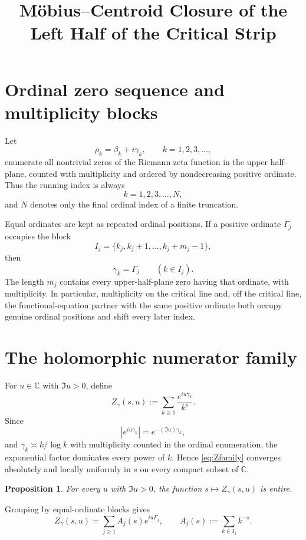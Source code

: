 \documentclass[11pt]{amsart}
\title{M\"obius--Centroid Closure of the Left Half of the Critical Strip}
\author{}
\date{}
\newtheorem{proposition}[theorem]{Proposition}
\theoremstyle{remark}
\begin{document}
\maketitle

\section{Ordinal zero sequence and multiplicity blocks}

Let
\[
\rho_k=\beta_k+i\gamma_k,\qquad k=1,2,3,\ldots,
\]
enumerate all nontrivial zeros of the Riemann zeta function in the upper half-plane, counted with multiplicity and ordered by nondecreasing positive ordinate.  Thus the running index is always
\[
k=1,2,3,\ldots,N,
\]
and $N$ denotes only the final ordinal index of a finite truncation.

Equal ordinates are kept as repeated ordinal positions.  If a positive ordinate $\Gamma_j$ occupies the block
\[
I_j=\{k_j,k_j+1,\ldots,k_j+m_j-1\},
\]
then
\[
\gamma_k=\Gamma_j\qquad(k\in I_j).
\]
The length $m_j$ contains every upper-half-plane zero having that ordinate, with multiplicity.  In particular, multiplicity on the critical line and, off the critical line, the functional-equation partner with the same positive ordinate both occupy genuine ordinal positions and shift every later index.

\section{The holomorphic numerator family}

For $u\in\mathbb C$ with $\Im u>0$, define
\begin{equation}\label{eq:Zfamily}
Z_\gamma(s,u)
:=
\sum_{k\ge1}\frac{e^{iu\gamma_k}}{k^s}.
\end{equation}
Since
\[
|e^{iu\gamma_k}|=e^{-(\Im u)\gamma_k},
\]
and $\gamma_k\asymp k/\log k$ with multiplicity counted in the ordinal enumeration, the exponential factor dominates every power of $k$.  Hence \eqref{eq:Zfamily} converges absolutely and locally uniformly in $s$ on every compact subset of $\mathbb C$.

\begin{proposition}\label{prop:entire}
For every $u$ with $\Im u>0$, the function $s\mapsto Z_\gamma(s,u)$ is entire.
\end{proposition}

Grouping by equal-ordinate blocks gives
\begin{equation}\label{eq:blockExpansion}
Z_\gamma(s,u)
=
\sum_{j\ge1} A_j(s)e^{iu\Gamma_j},
\qquad
A_j(s):=\sum_{k\in I_j}k^{-s}.
\end{equation}
\end{document}
